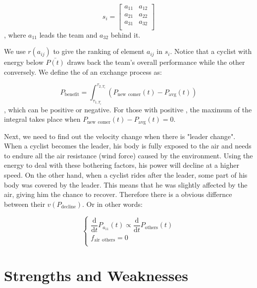 \documentclass{article}
\begin{document}
				\[s_i=\left[ \begin{matrix}
					a_{11}&		a_{12}\\
					a_{21}&		a_{22}\\
					a_{31}&		a_{32}\\
				\end{matrix} \right] \]
				, where \(a_{11}\) leads the team and \(a_{32}\) behind it.

				We use \(r\left( a_{ij} \right) \) to give the ranking of element \(a_{ij}\) in \(s_i\). Notice that a cyclist with energy below \(\bar{P\left( t \right) }\) draws back the team's overall performance while the other conversely. We define the  of an exchange process as:

				\[P_\mathrm{benefit} =\int_{\tau _{1,T_i}}^{\tau _{2,T_i}}{\left( P_{\mathrm{new}\:\:\mathrm{comer}}\left( t \right) -P_{\mathrm{avg}}\left( t \right) \right)}\], which can be positive or negative. For those with positive , the maximum of the integral takes place when \(P_{\mathrm{new}\:\:\mathrm{comer}}\left( t \right) -P_{\mathrm{avg}}\left( t \right) =0\).

				Next, we need to find out the velocity change when there is "leader change". When a cyclist becomes the leader, his body is fully exposed to the air and needs to endure all the air resistance (wind force) caused by the environment. Using the energy to deal with these bothering factors, his power will decline at a higher speed. On the other hand, when a cyclist rides after the leader, some part of his body was covered by the leader. This means that he was slightly affected by the air, giving him the chance to recover. Therefore there is a obvious differnce between their $v(P_\mathrm{decline})$. Or in other words:

				\[
					\begin{cases}
						\dfrac{\mathrm{d}}{\mathrm{d}t}P_{a_{11}}\left( t \right) \propto \dfrac{\mathrm{d}}{\mathrm{d}t}P_{\mathrm{others}}\left( t \right)\\
						f_{\mathrm{air}\:\:\mathrm{others}}=0\\
					\end{cases}
				\]



	\section{Strengths and Weaknesses}
\end{document}
